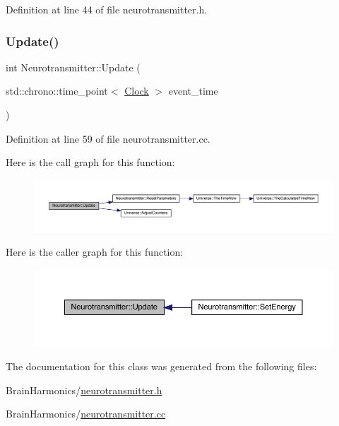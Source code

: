 Definition at line 44 of file neurotransmitter.\+h.

\mbox{\label{class_neurotransmitter_ac9f7be22ca7242207de76ec5e1b055b1}} 
\subsubsection{\texorpdfstring{Update()}{Update()}}
{\footnotesize\ttfamily int Neurotransmitter\+::\+Update (\begin{DoxyParamCaption}\item[{std\+::chrono\+::time\+\_\+point$<$ \hyperlink{universe_8h_a0ef8d951d1ca5ab3cfaf7ab4c7a6fd80}{Clock} $>$}]{event\+\_\+time }\end{DoxyParamCaption})}



Definition at line 59 of file neurotransmitter.\+cc.

Here is the call graph for this function\+:
\nopagebreak
\begin{figure}[H]
\begin{center}
\leavevmode
\includegraphics[width=350pt]{class_neurotransmitter_ac9f7be22ca7242207de76ec5e1b055b1_cgraph}
\end{center}
\end{figure}
Here is the caller graph for this function\+:
\nopagebreak
\begin{figure}[H]
\begin{center}
\leavevmode
\includegraphics[width=350pt]{class_neurotransmitter_ac9f7be22ca7242207de76ec5e1b055b1_icgraph}
\end{center}
\end{figure}


The documentation for this class was generated from the following files\+:\begin{DoxyCompactItemize}
\item 
Brain\+Harmonics/\hyperlink{neurotransmitter_8h}{neurotransmitter.\+h}\item 
Brain\+Harmonics/\hyperlink{neurotransmitter_8cc}{neurotransmitter.\+cc}\end{DoxyCompactItemize}
